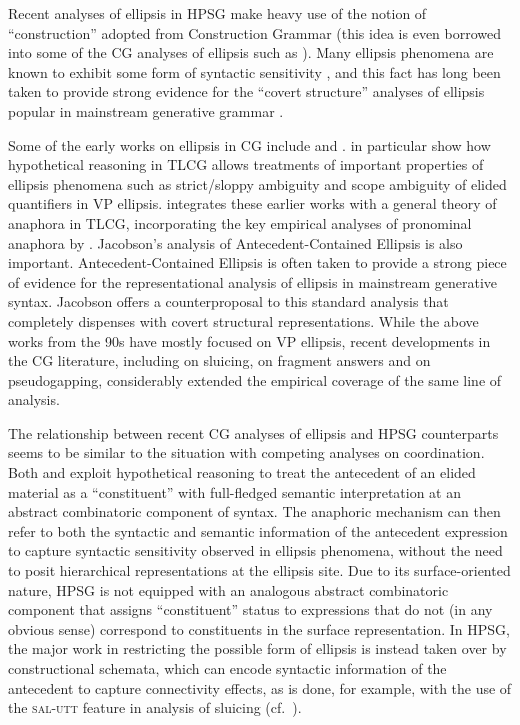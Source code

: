 \documentclass[output=paper
                ,modfonts
                ,nonflat
	        ,collection
	        ,collectionchapter
	        ,collectiontoclongg
 	        ,biblatex
                ,babelshorthands
                ,newtxmath
                ,draftmode
                ,colorlinks, citecolor=brown
]{./langsci/langscibook}
\begin{document}
Recent analyses of ellipsis in HPSG \citep{GSag2000a-u,millereisspseudo}
make heavy use of the notion of ``construction'' adopted from
Construction Grammar (this idea is even borrowed into some of the CG
analyses of ellipsis such as \citealt{jacobson2016}). Many ellipsis phenomena
are known to exhibit some form of syntactic sensitivity
\citep{kennedy2003,chung13,yoshida-ea-pg}, and this fact has long been
taken to provide strong evidence for the ``covert structure'' analyses
of ellipsis popular in mainstream generative grammar \citep{merchant13}.

Some of the early works on ellipsis in CG include
\citet{hendriks-diss} and \citet{morrillmerenciano1996}.
\citet{morrillmerenciano1996} in particular show how hypothetical
reasoning in TLCG allows treatments of important properties of
ellipsis phenomena such as strict/sloppy ambiguity and scope ambiguity
of elided quantifiers in VP ellipsis. \citet{jaeger05} integrates
these earlier works with a general theory of anaphora in TLCG,
incorporating the key empirical analyses of pronominal anaphora by
\citet{jacobson1999a,jacobson2000a}. Jacobson's
\citeyearpar{jacobson_p1998a,jacobson2008} analysis of
Antecedent-Contained Ellipsis is also important. Antecedent-Contained
Ellipsis is often taken to provide a strong piece of evidence for the
representational analysis of ellipsis in mainstream generative syntax.
Jacobson offers a counterproposal to this standard analysis that
completely dispenses with covert structural representations. While the
above works from the 90s have mostly focused on VP ellipsis, recent
developments in the CG literature, including \citet{barker-sluicing}
on sluicing, \citet{jacobson2016} on fragment answers and
\citet{kubota-levine-pseudo} on pseudogapping, considerably extended
the empirical coverage of the same line of analysis.

The relationship between recent CG analyses of ellipsis and
HPSG counterparts seems to be similar to the situation with competing
analyses on coordination. Both \citet{barker-sluicing} and
\citet{kubota-levine-pseudo} exploit hypothetical reasoning to treat the
antecedent of an elided material as a ``constituent'' with full-fledged
semantic interpretation at an abstract combinatoric component of
syntax. The anaphoric mechanism can then refer to both the syntactic
and semantic information of the antecedent expression to capture
syntactic sensitivity observed in ellipsis phenomena, without the need
to posit hierarchical representations at the ellipsis site. Due to its
surface-oriented nature, HPSG is not equipped with an analogous
abstract combinatoric component that assigns ``constituent'' status to
expressions that do not (in any obvious sense) correspond to
constituents in the surface representation. In HPSG, the major work in
restricting the possible form of ellipsis is instead
taken over by constructional schemata, which can encode
syntactic information of the antecedent to capture connectivity
effects, as is done, for example, with the use of the 
\textsc{sal-utt} feature in  analysis of sluicing
(cf.~).
\end{document}
